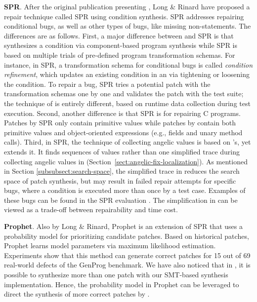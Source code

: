\textbf{SPR}. 
After the original publication presenting \nopol \cite{demarco2014automatic}, Long \& Rinard \cite{DBLP:conf/sigsoft/LongR15} have proposed a repair technique called SPR using condition synthesis. SPR addresses repairing conditional bugs, as well as other types of bugs, like missing non-\ourif statements. The differences are as follows.
First, a major difference between \nopol and SPR is that \nopol synthesizes a condition via component-based program synthesis while SPR is based on multiple trials of pre-defined program transformation schemas. For instance, in SPR, a transformation schema for conditional bugs is called \textit{condition refinement}, which updates an existing condition in an \ourif via tightening or loosening the condition. To repair a bug, SPR tries a potential patch with the transformation schemas one by one and validates the patch with the test suite; the technique of \nopol is entirely different, based on runtime data collection during test execution. 
Second, another difference is that SPR is for repairing C programs. Patches by SPR only contain primitive values while patches by \nopol contain both primitive values and object-oriented expressions (e.g., fields and unary method calls). 
Third, in SPR, the technique of collecting angelic values is based on \nopol's, yet extends it.
It finds sequences of values rather than one simplified trace during collecting angelic values in \nopol (Section~\ref{sect:angelic-fix-localization}). As mentioned in Section \ref{subsubsect:search-space}, the simplified trace in \nopol reduces the search space of patch synthesis, but may result in failed repair attempts for specific bugs, where a condition is executed more than once by a test case. Examples of these bugs can be found in the SPR evaluation \cite{DBLP:conf/sigsoft/LongR15}. The simplification in \nopol can be viewed as a trade-off between repairability and time cost. 

\textbf{Prophet}. Also by Long \& Rinard, Prophet is an extension of SPR that uses a probability model for prioritizing candidate patches. Based on historical patches, Prophet learns model parameters via maximum likelihood estimation. Experiments show that this method can generate correct patches for 15 out of 69 real-world defects of the GenProg benchmark. We have also noticed that in \nopol, it is possible to synthesize more than one patch with our SMT-based synthesis implementation. Hence, the probability model in Prophet can be leveraged to direct the synthesis of more correct patches by \nopol.  

